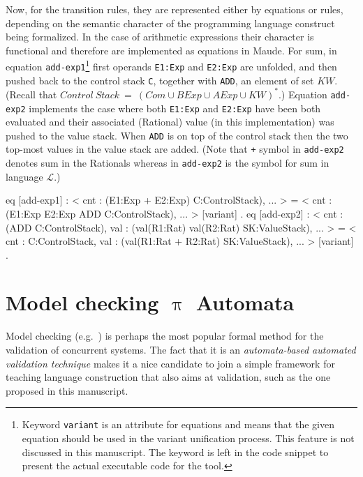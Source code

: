\documentclass[a4paper,openany]{book}
\begin{document}
Now, for the transition rules, they are represented either by equations or rules, depending on the semantic character of the programming language construct being formalized. In the case of arithmetic expressions 
their character is functional and therefore are implemented as equations in Maude. For sum, in equation \texttt{add-exp1}\footnote{Keyword \texttt{variant} is an attribute for equations and means that the given equation should be used in the variant unification process. This feature is not discussed in this manuscript. The keyword is left in the code snippet to present the actual executable code for the tool.}  first operands \texttt{E1:Exp} and \texttt{E2:Exp} are unfolded, and then pushed back to the control stack \texttt{C}, together with \texttt{ADD}, an element of set $\mathit{KW}$. (Recall that $\mathit{Control~Stack} ~=~ (\mathit{Com} \cup \mathit{BExp} \cup \mathit{AExp} \cup \mathit{KW})^*$.) Equation \texttt{add-exp2} implements the case where both \texttt{E1:Exp} and \texttt{E2:Exp} have been both evaluated and their associated (Rational) value (in this implementation) was pushed to the value stack. When \texttt{ADD} is on top of the control stack then the two top-most values in the value stack are added. (Note that \texttt{+} symbol in \texttt{add-exp2} denotes sum in the Rationals whereas in  \texttt{add-exp2} is the symbol for sum in language $\mathcal{L}$.)
\begin{maude}
eq [add-exp1] : < cnt : (E1:Exp + E2:Exp) C:ControlStack), ... >  =
               < cnt : (E1:Exp E2:Exp ADD C:ControlStack), ... > [variant] .
eq [add-exp2] : < cnt : (ADD C:ControlStack), 
                 val : (val(R1:Rat) val(R2:Rat) SK:ValueStack), ... >  =
               < cnt : C:ControlStack, 
                 val : (val(R1:Rat + R2:Rat) SK:ValueStack), ... > [variant] .
\end{maude}

\section{Model checking $\uppi$ Automata}\label{sec:mc-pia}

Model checking (e.g.~\cite{Clarke:2000:MC:332656}) is perhaps the most popular formal method for the validation of concurrent systems. The fact that it is an \emph{automata-based automated validation technique} makes it a nice candidate to join a simple framework for teaching language construction that also aims at validation, such as the one proposed in this manuscript.
\end{document}
